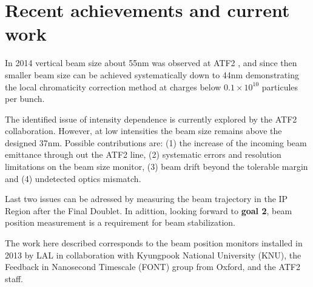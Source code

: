 {{\section{Recent achievements and current work}
In 2014 vertical beam size about 55nm was observed at ATF2 \cite{Kubo50nm}, and since then smaller beam size can be achieved systematically down to 44nm \cite{KuboCLICws2015} demonstrating the local chromaticity correction method at charges below $0.1\times10^{10}$ particules per bunch.\par
The identified issue of intensity dependence is currently explored by the ATF2 collaboration. However, at low intensities the beam size remains above the designed 37nm. Possible contributions are: (1) the increase of the incoming beam emittance through out the ATF2 line, (2) systematic errors and resolution limitations on the beam size monitor, (3) beam drift beyond the tolerable margin and  (4) undetected optics mismatch.\par
Last two issues can be adressed by measuring the beam trajectory in the IP Region after the Final Doublet. In adittion, looking forward to \textbf{goal 2}, beam position measurement is a requirement for beam stabilization.\par
The work here described corresponds to the beam position monitors installed in 2013 by LAL in collaboration with Kyungpook National University (KNU), the Feedback in Nanosecond Timescale (FONT) group from Oxford, and the ATF2 staff.\par

}}
